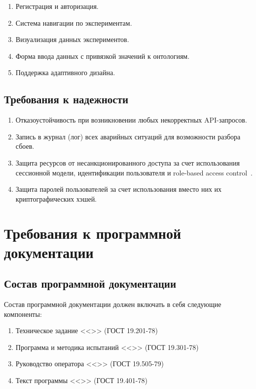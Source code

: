 \documentclass[a4paper,12pt,reqno]{article}
\begin{document}
    \begin{enumerate}
        \item Регистрация и авторизация.
        \item Система навигации по экспериментам.
        \item Визуализация данных экспериментов.
        \item Форма ввода данных с привязкой значений к онтологиям.
        \item Поддержка адаптивного дизайна.
    \end{enumerate}

    \subsection{Требования к надежности}

    \begin{enumerate}
        \item Отказоустойчивость при возникновении любых некорректных API-запросов.
        \item Запись в журнал (лог) всех аварийных ситуаций для возможности разбора сбоев.
        \item Защита ресурсов от несанкционированного доступа за счет использования сессионной модели, идентификации пользователя и role-based access control~\cite{arch:RBAC}.
        \item Защита паролей пользователей за счет использования вместо них их криптографических хэшей.
    \end{enumerate}

    \section{Требования к программной документации}

    \subsection{Состав программной документации}
    Состав программной документации должен включать в себя следующие компоненты:
    \begin{enumerate}
        \item Техническое задание <<\unskip>> (ГОСТ 19.201-78) \label{tz}
        \item Программа и методика испытаний <<\unskip>> (ГОСТ 19.301-78) \label{pmi}
        \item Руководство оператора <<\unskip>> (ГОСТ 19.505-79) \label{ro}
        \item Текст программы <<\unskip>> (ГОСТ 19.401-78) \label{tp}
    \end{enumerate}
\end{document}
